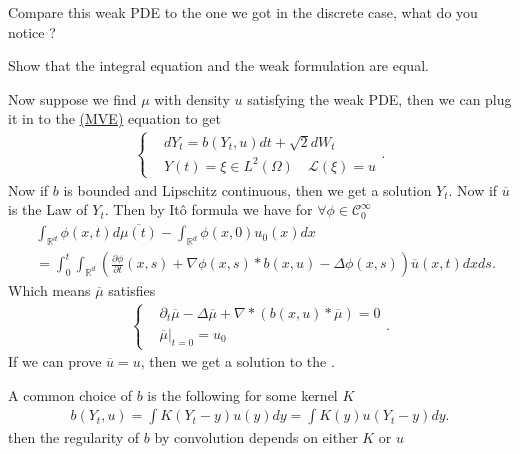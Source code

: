 \begin{remark}
 Compare this weak PDE to the one we got in the discrete case, what do you\\ notice ?
\end{remark}
\begin{exercise}
 Show that the integral equation and the weak formulation are equal.
\end{exercise}
\begin{remark}
 Now suppose we find $\mu $ with density $u$ satisfying the weak PDE, then we can plug it in to the \hyperref[MVE]{(MVE)} equation
 to get
 \begin{align*}
   \begin{cases}
    &dY_t = b(Y_t,u) dt + \sqrt{2} dW_t \\
    &Y(t) = \xi \in  L^2(\Omega ) \quad \mathcal{L}(\xi) = u
  \end{cases}
 .\end{align*}
 Now if $b$ is bounded and Lipschitz continuous, then we get a solution $Y_t $. Now if $\overline{u} $ is the Law of $Y_t$.
 Then by It\^o formula we have for $\forall  \phi \in \mathcal{C}_0^{\infty} $
\begin{align*}
  &\int_{\mathbb{R}^{d} } \phi (x,t) d\overline{\mu(t)}  - \int_{\mathbb{R}^{d} } \phi(x,0) u_0(x) dx \\
  &=  \int_0^{t} \int_{\mathbb{R}^{d} } \left(\frac{\partial \phi }{\partial t}(x,s) + \nabla \phi(x,s)*b(x,u) -  \Delta \phi(x,s)\right)\overline{u}(x,t) dx ds
.\end{align*}
Which means $\overline{\mu } $ satisfies
\begin{align*}
  \begin{cases}
    &\partial_t \overline{\mu }  - \Delta \overline{\mu }  + \nabla * (b(x,u)*\overline{\mu } ) = 0\\
    &\overline{\mu } \rvert_{t=0}  = u_0
  \end{cases}
.\end{align*}
If we can prove $\overline{u} = u $, then we get a solution to the . 
\end{remark}
\begin{example}
 A common choice of $b$ is the following for some kernel $K$
\begin{align*}
  b(Y_t,u) = \int K(Y_t-y)u(y) dy = \int K(y)u(Y_t-y) dy
.\end{align*}
then the regularity of $b$ by convolution depends on either $K$ or $u$
\end{example}
